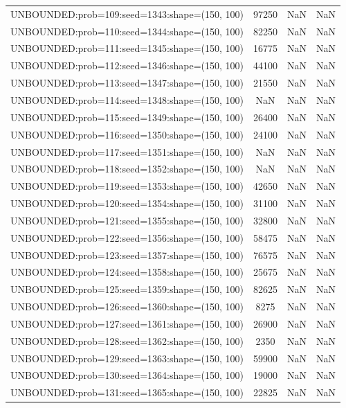 \begin{longtable}{lccc}
UNBOUNDED:prob=109:seed=1343:shape=(150, 100) & 97250 &   NaN &    NaN \\
UNBOUNDED:prob=110:seed=1344:shape=(150, 100) & 82250 &   NaN &    NaN \\
UNBOUNDED:prob=111:seed=1345:shape=(150, 100) & 16775 &   NaN &    NaN \\
UNBOUNDED:prob=112:seed=1346:shape=(150, 100) & 44100 &   NaN &    NaN \\
UNBOUNDED:prob=113:seed=1347:shape=(150, 100) & 21550 &   NaN &    NaN \\
UNBOUNDED:prob=114:seed=1348:shape=(150, 100) &   NaN &   NaN &    NaN \\
UNBOUNDED:prob=115:seed=1349:shape=(150, 100) & 26400 &   NaN &    NaN \\
UNBOUNDED:prob=116:seed=1350:shape=(150, 100) & 24100 &   NaN &    NaN \\
UNBOUNDED:prob=117:seed=1351:shape=(150, 100) &   NaN &   NaN &    NaN \\
UNBOUNDED:prob=118:seed=1352:shape=(150, 100) &   NaN &   NaN &    NaN \\
UNBOUNDED:prob=119:seed=1353:shape=(150, 100) & 42650 &   NaN &    NaN \\
UNBOUNDED:prob=120:seed=1354:shape=(150, 100) & 31100 &   NaN &    NaN \\
UNBOUNDED:prob=121:seed=1355:shape=(150, 100) & 32800 &   NaN &    NaN \\
UNBOUNDED:prob=122:seed=1356:shape=(150, 100) & 58475 &   NaN &    NaN \\
UNBOUNDED:prob=123:seed=1357:shape=(150, 100) & 76575 &   NaN &    NaN \\
UNBOUNDED:prob=124:seed=1358:shape=(150, 100) & 25675 &   NaN &    NaN \\
UNBOUNDED:prob=125:seed=1359:shape=(150, 100) & 82625 &   NaN &    NaN \\
UNBOUNDED:prob=126:seed=1360:shape=(150, 100) &  8275 &   NaN &    NaN \\
UNBOUNDED:prob=127:seed=1361:shape=(150, 100) & 26900 &   NaN &    NaN \\
UNBOUNDED:prob=128:seed=1362:shape=(150, 100) &  2350 &   NaN &    NaN \\
UNBOUNDED:prob=129:seed=1363:shape=(150, 100) & 59900 &   NaN &    NaN \\
UNBOUNDED:prob=130:seed=1364:shape=(150, 100) & 19000 &   NaN &    NaN \\
UNBOUNDED:prob=131:seed=1365:shape=(150, 100) & 22825 &   NaN &    NaN \\

\end{longtable}
